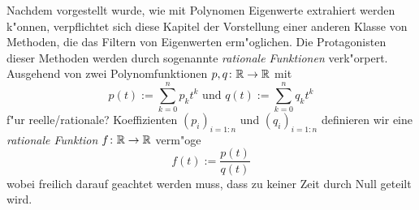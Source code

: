 Nachdem vorgestellt wurde, wie mit Polynomen Eigenwerte extrahiert werden k"onnen,
verpflichtet sich diese Kapitel der Vorstellung einer anderen Klasse von Methoden, die
das Filtern von Eigenwerten erm"oglichen. Die Protagonisten dieser Methoden werden
durch sogenannte \emph{rationale Funktionen} verk"orpert. Ausgehend
von zwei Polynomfunktionen $p, q\colon{\mathbb{R}}\to\mathbb{R}$ mit
\[
p(t) := \sum_{k=0}^n p_k t^k \text{ \ und\ } q(t) := \sum_{k=0}^n q_k t^k
\]
f"ur reelle/rationale? Koeffizienten $(p_i)_{i=1:n}$ und $(q_i)_{i=1:n}$
definieren wir eine \emph{rationale Funktion} $f\colon\mathbb{R}\to\mathbb{R}$ verm"oge
\[
f(t) := \frac{p(t)}{q(t)}
\]
wobei freilich darauf geachtet werden muss, dass zu keiner Zeit durch Null
geteilt wird.
